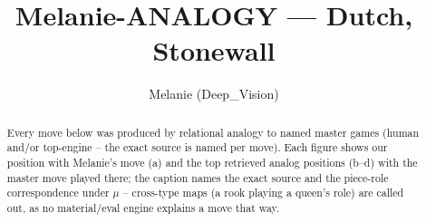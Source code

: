 \documentclass[11pt]{article}
\title{Melanie-ANALOGY — Dutch, Stonewall}
\author{Melanie (Deep\_Vision)}
\date{}
\begin{document}
\maketitle

\begin{abstract}Every move below was produced by relational analogy to named master games (human and/or top-engine -- the exact source is named per move). Each figure shows our position with Melanie's move (a) and the top retrieved analog positions (b--d) with the master move played there; the caption names the exact source and the piece-role correspondence under $\mu$ -- cross-type maps (a rook playing a queen's role) are called out, as no material/eval engine explains a move that way.\end{abstract}

\begin{figure}[p]\centering
\begin{subfigure}{0.46\textwidth}\centering
\resizebox{\linewidth}{!}{%
\newchessgame
\chessboard[
  setfen={rnbqk2r/pp4pp/2pbpn2/3P1p2/3P4/5NP1/PP2PPBP/RNBQ1RK1 b kq - 0 7},
  showmover=false,
  pgfstyle=straightmove, color=movearrow, markmove={e6-d5}
]}
\caption{}
\end{subfigure}\hfill
\begin{subfigure}{0.46\textwidth}\centering
\resizebox{\linewidth}{!}{%
\newchessgame
\chessboard[
  setfen={rnbq1rk1/pp3pbp/3p1np1/2pp4/2P1P3/2N1BP2/PP1Q2PP/R3KBNR w KQ - 0 9},
  showmover=false,
  pgfstyle=straightmove, color=movearrow, markmove={c4-d5}
]}
\caption{}
\end{subfigure}
\\[4pt]
\begin{subfigure}{0.46\textwidth}\centering
\resizebox{\linewidth}{!}{%
\newchessgame
\chessboard[
  setfen={rnbq1rk1/pp3pbp/3p1np1/2pp4/2P1P3/2N1BP2/PP1Q2PP/R3KBNR w KQ - 0 9},
  showmover=false,
  pgfstyle=straightmove, color=movearrow, markmove={c4-d5}
]}
\caption{}
\end{subfigure}\hfill
\begin{subfigure}{0.46\textwidth}\centering
\resizebox{\linewidth}{!}{%
\newchessgame
\chessboard[
  setfen={rnbq1rk1/pp3pbp/3p1np1/2pp4/2P1P3/2N1BP2/PP4PP/RN1QKB1R w KQ - 0 9},
  showmover=false,
  pgfstyle=straightmove, color=movearrow, markmove={c4-d5}
]}
\caption{}
\end{subfigure}

\end{figure}
\end{document}
